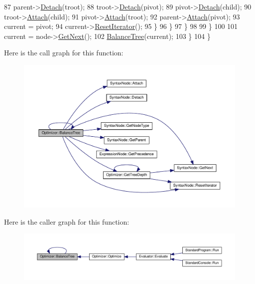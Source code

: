 \begin{DoxyCode}
87                         parent->\hyperlink{classSyntaxNode_ae57f629a5c5fa0994f036c105396da69}{Detach}(troot);
88                         troot->\hyperlink{classSyntaxNode_ae57f629a5c5fa0994f036c105396da69}{Detach}(pivot);
89                         pivot->\hyperlink{classSyntaxNode_ae57f629a5c5fa0994f036c105396da69}{Detach}(child);
90                         troot->\hyperlink{classSyntaxNode_af25fd5963125bb2d6b9a1864b9ff79c8}{Attach}(child);
91                         pivot->\hyperlink{classSyntaxNode_af25fd5963125bb2d6b9a1864b9ff79c8}{Attach}(troot);
92                         parent->\hyperlink{classSyntaxNode_af25fd5963125bb2d6b9a1864b9ff79c8}{Attach}(pivot);
93                         current = pivot;
94                         current->\hyperlink{classSyntaxNode_ac51307368fb255aa760b99e137178c89}{ResetIterator}();
95                     \}
96                 \}
97             \}
98 
99         \}
100 
101         current = node->\hyperlink{classSyntaxNode_af1fa46ba30aa4f2affa2d4e96a4be010}{GetNext}();
102         \hyperlink{classOptimizer_ad84621adb872b88ab7fdb3672064cfdb}{BalanceTree}(current);
103     \}
104 \}
\end{DoxyCode}


Here is the call graph for this function\+:\nopagebreak
\begin{figure}[H]
\begin{center}
\leavevmode
\includegraphics[width=350pt]{classOptimizer_ad84621adb872b88ab7fdb3672064cfdb_cgraph}
\end{center}
\end{figure}




Here is the caller graph for this function\+:\nopagebreak
\begin{figure}[H]
\begin{center}
\leavevmode
\includegraphics[width=350pt]{classOptimizer_ad84621adb872b88ab7fdb3672064cfdb_icgraph}
\end{center}
\end{figure}


